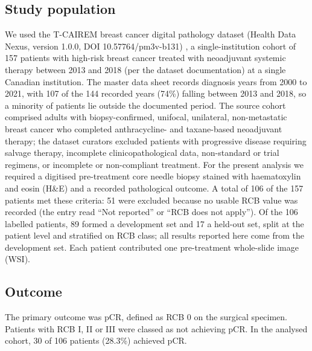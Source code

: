 \documentclass[10pt,a4paper,twocolumn]{article}
\begin{document}
\subsection{Study population}
We used the T-CAIREM breast cancer digital pathology dataset (Health Data Nexus, version 1.0.0, DOI 10.57764/pm3v-b131) \cite{tran2025}, a single-institution cohort of 157 patients with high-risk breast cancer treated with neoadjuvant systemic therapy between 2013 and 2018 (per the dataset documentation) at a single Canadian institution. The master data sheet records diagnosis years from 2000 to 2021, with 107 of the 144 recorded years (74\%) falling between 2013 and 2018, so a minority of patients lie outside the documented period. The source cohort comprised adults with biopsy-confirmed, unifocal, unilateral, non-metastatic breast cancer who completed anthracycline- and taxane-based neoadjuvant therapy; the dataset curators excluded patients with progressive disease requiring salvage therapy, incomplete clinicopathological data, non-standard or trial regimens, or incomplete or non-compliant treatment. For the present analysis we required a digitised pre-treatment core needle biopsy stained with haematoxylin and eosin (H\&E) and a recorded pathological outcome. A total of 106 of the 157 patients met these criteria: 51 were excluded because no usable RCB value was recorded (the entry read ``Not reported'' or ``RCB does not apply''). Of the 106 labelled patients, 89 formed a development set and 17 a held-out set, split at the patient level and stratified on RCB class; all results reported here come from the development set. Each patient contributed one pre-treatment whole-slide image (WSI).

\subsection{Outcome}
The primary outcome was pCR, defined as RCB 0 on the surgical specimen. Patients with RCB I, II or III were classed as not achieving pCR. In the analysed cohort, 30 of 106 patients (28.3\%) achieved pCR.
\end{document}
